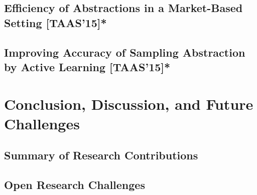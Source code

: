\documentclass[10pt,a4paper]{book}
\begin{document}
\section{Efficiency of Abstractions in a Market-Based Setting [TAAS'15]*}
\section{Improving Accuracy of Sampling Abstraction by Active Learning [TAAS'15]*}
\chapter{Conclusion, Discussion, and Future Challenges}
\section{Summary of Research Contributions}
\section{Open Research Challenges}
\end{document}

